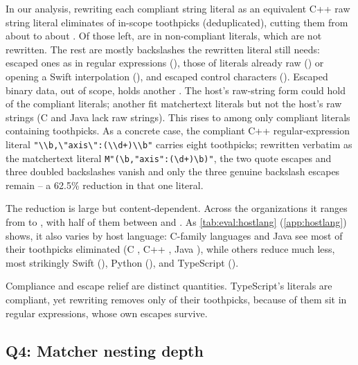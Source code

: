 In our analysis,
rewriting each compliant string literal
as an equivalent C++ raw string literal
eliminates \dataReduction of in-scope toothpicks
(\dataDedupReduction deduplicated),
cutting them
from about \dataScopeToothpicks to about \dataToothpicksConverted.
Of those left,
\dataKeptNonCompliant are in non-compliant literals, which are not rewritten.
The rest are mostly backslashes the rewritten literal still needs:
escaped ones as in regular expressions (\dataKeptBackslash),
those of literals already raw (\dataKeptRaw) or opening a Swift interpolation (\dataKeptInterpolation),
and escaped control characters (\dataKeptControl).
Escaped binary data, out of scope, holds another \dataBinaryToothpicks.
The host's raw-string form could hold \dataRawHoldableShare
of the compliant literals;
another \dataMtOnlyShare fit matchertext literals
but not the host's raw strings
(\eg C and Java lack raw strings).
This \dataMtOnlyShare rises to \dataMtOnlyShareWith
among only compliant literals containing toothpicks.
As a concrete case,
the compliant C++ regular-expression literal
\verb|"\\b,\"axis\":(\\d+)\\b"|
carries eight toothpicks;
rewritten verbatim as the matchertext literal
\verb|M"(\b,"axis":(\d+)\b)"|,
the two quote escapes and three doubled backslashes vanish
and only the three genuine backslash escapes remain --
a 62.5\% reduction in that one literal.

The reduction is large but content-dependent.
Across the \dataOrgs organizations it ranges
from \dataOrgReductionMin to \dataOrgReductionMax,
with half of them between \dataOrgReductionQOne and \dataOrgReductionQThree.
As \cref{tab:eval:hostlang} (\cref{app:hostlang}) shows, it also varies by host language:
C-family languages and Java
see most of their toothpicks eliminated
(C \dataHostCReduction, C++ \dataHostCppReduction, Java \dataHostJavaReduction),
while others reduce much less,
most strikingly Swift (\dataHostSwiftReduction), Python (\dataHostPythonReduction),
and TypeScript (\dataHostTypeScriptReduction).

Compliance and escape relief are distinct quantities.
TypeScript's literals are \dataHostTypeScriptCompliance{} compliant,
yet rewriting removes only \dataHostTypeScriptReduction{} of their toothpicks,
because \dataTsRegexToothpickShare{} of them sit in regular expressions,
whose own escapes survive.


\subsection{Q4: Matcher nesting depth}
\label{sec:eval:nesting}

